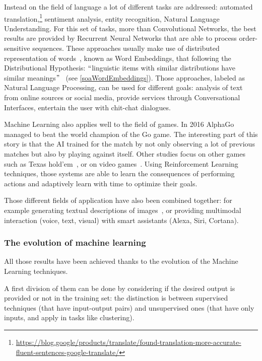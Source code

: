 Instead on the field of language a lot of different tasks are addressed: automated translation,\footnote{\url{https://blog.google/products/translate/found-translation-more-accurate-fluent-sentences-google-translate/}} sentiment analysis, entity recognition, Natural Language Understanding. For this set of tasks, more than Convolutional Networks, the best results are provided by Recurrent Neural Networks that are able to process order-sensitive sequences. These approaches usually make use of distributed representation of words~\cite{bengio2003neural}, known as Word Embeddings, that following the Distributional Hypothesis: $``$linguistic items with similar distributions have similar meanings$"$~\cite{sahlgren2008distributional} (see \ref{soaWordEmbeddings}). Those approaches, labeled as Natural Language Processing, can be used for different goals: analysis of text from online sources or social media, provide services through Conversational Interfaces, entertain the user with chit-chat dialogues.

Machine Learning also applies well to the field of games. In 2016 AlphaGo~\cite{chouard2016go} managed to beat the world champion of the Go game. The interesting part of this story is that the AI trained for the match by not only observing a lot of previous matches but also by playing against itself. Other studies focus on other games such as Texas hold'em~\cite{brown2017superhuman}, or on video games~\cite{mnih2015human}. Using Reinforcement Learning techniques, those systems are able to learn the consequences of performing actions and adaptively learn with time to optimize their goals.

Those different fields of application have also been combined together: for example generating textual descriptions of images~\cite{xu2015show}, or providing multimodal interaction (voice, text, visual) with smart assistants (Alexa, Siri, Cortana).

\subsubsection{The evolution of machine learning}
All those results have been achieved thanks to the evolution of the Machine Learning techniques.

A first division of them can be done by considering if the desired output is provided or not in the training set: the distinction is between supervised techniques (that have input-output pairs) and unsupervised ones (that have only inputs, and apply in tasks like clustering).

